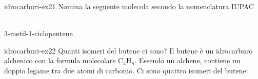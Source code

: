 \documentclass[preview]{standalone}
\begin{document}
\begin{snippetexercise}{idrocarburi-ex21}
    {Nomina la seguente molecola secondo la nomenclatura IUPAC}
    \begin{center}
        \\\vspace{0.25cm}
        3-metil-1-ciclopentene
    \end{center}
\end{snippetexercise}

\begin{snippetexercise}{idrocarburi-ex22}
    {Quanti isomeri del butene ci sono?}
    Il butene è un idrocarburo alchenico con la formula molecolare
    C\({}_4\)H\({}_8\). Essendo un alchene, contiene un doppio legame tra due atomi di carbonio. Ci sono quattro isomeri del butene:


\end{snippetexercise}
\end{document}
